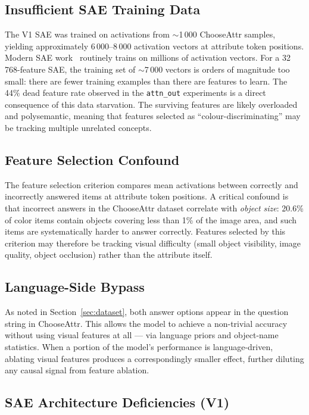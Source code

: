 \documentclass[11pt,a4paper]{article}
\begin{document}
\subsection{Insufficient SAE Training Data}

The V1 SAE was trained on activations from $\sim$1\,000 ChooseAttr samples, yielding approximately
6\,000--8\,000 activation vectors at attribute token positions.
Modern SAE work~\citep{bricken2023monosemanticity,templeton2024scaling} routinely trains on
millions of activation vectors.
For a 32\,768-feature SAE, the training set of $\sim$7\,000 vectors is orders of magnitude too small:
there are fewer training examples than there are features to learn.
The 44\% dead feature rate observed in the \texttt{attn\_out} experiments is a direct consequence of
this data starvation. The surviving features are likely overloaded and polysemantic, meaning that
features selected as ``colour-discriminating'' may be tracking multiple unrelated concepts.

\subsection{Feature Selection Confound}

The feature selection criterion compares mean activations between correctly and incorrectly answered
items at attribute token positions.
A critical confound is that incorrect answers in the ChooseAttr dataset correlate with
\emph{object size}: 20.6\% of color items contain objects covering less than 1\% of the image area,
and such items are systematically harder to answer correctly.
Features selected by this criterion may therefore be tracking visual difficulty (small object
visibility, image quality, object occlusion) rather than the attribute itself.

\subsection{Language-Side Bypass}

As noted in Section~\ref{sec:dataset}, both answer options appear in the question string in
ChooseAttr.
This allows the model to achieve a non-trivial accuracy without using visual features at all —
via language priors and object-name statistics.
When a portion of the model's performance is language-driven, ablating visual features produces
a correspondingly smaller effect, further diluting any causal signal from feature ablation.

\subsection{SAE Architecture Deficiencies (V1)}
\end{document}
